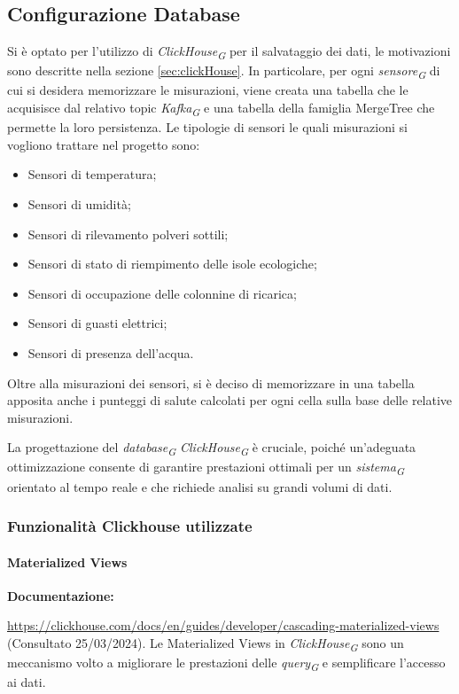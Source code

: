 \subsection{Configurazione Database}
Si è optato per l'utilizzo di \textit{ClickHouse}\textsubscript{\textit{G}} per il salvataggio dei dati, le motivazioni sono descritte nella sezione \ref{sec:clickHouse}. In particolare, per ogni \textit{sensore}\textsubscript{\textit{G}} di cui si desidera memorizzare le misurazioni, viene creata una tabella che le acquisisce dal relativo topic \textit{Kafka}\textsubscript{\textit{G}} e una tabella della famiglia MergeTree che permette la loro persistenza.
Le tipologie di sensori le quali misurazioni si vogliono trattare nel progetto sono:
\begin{itemize}
    \item Sensori di temperatura;
    \item Sensori di umidità;
    \item Sensori di rilevamento polveri sottili; 
    \item Sensori di stato di riempimento delle isole ecologiche;
    \item Sensori di occupazione delle colonnine di ricarica;
    \item Sensori di guasti elettrici;
    \item Sensori di presenza dell'acqua.
\end{itemize}
Oltre alla misurazioni dei sensori, si è deciso di memorizzare in una tabella apposita anche i punteggi di salute calcolati per ogni cella sulla base delle relative misurazioni.

La progettazione del \textit{database}\textsubscript{\textit{G}} \textit{ClickHouse}\textsubscript{\textit{G}} è cruciale, poiché un'adeguata ottimizzazione consente di garantire prestazioni ottimali per un \textit{sistema}\textsubscript{\textit{G}} orientato al tempo reale e che richiede analisi su grandi volumi di dati.

\subsubsection{Funzionalità Clickhouse utilizzate}
\paragraph{Materialized Views}
\textbf{Documentazione:}

\url{https://clickhouse.com/docs/en/guides/developer/cascading-materialized-views} (Consultato 25/03/2024).\newline
Le Materialized Views in \textit{ClickHouse}\textsubscript{\textit{G}} sono un meccanismo volto a migliorare le prestazioni delle \textit{query}\textsubscript{\textit{G}} e semplificare l'accesso ai dati.

